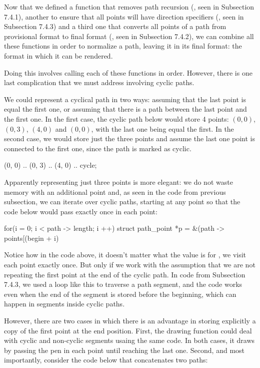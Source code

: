 Now that we defined a function that removes path recursion
(, seen in Subsection 7.4.1),
another to ensure that all points will have direction specifiers
(, seen in Subsection 7.4.3) and
a third one that converts all points of a path from provisional format
to final format (, seen in Subsection
7.4.2), we can combine all these functions in order to normalize a
path, leaving it in its final format: the format in which it can
be rendered.

Doing this involves calling each of these functions in order. However,
there is one last complication that we must address involving cyclic
paths.

We could represent a cyclical path in two ways: assuming that the last
point is equal the first one, or assuming that there is a path between
the last point and the first one. In the first case, the cyclic path
below would store 4 points: $(0, 0)$, $(0, 3)$, $(4, 0)$ and $(0, 0)$,
with the last one being equal the first. In the second case, we would
store just the three points and assume the last one point is connected
to the first one, since the path is marked as cyclic.

\alinhaverbatim
(0, 0) .. (0, 3) .. (4, 0) .. cycle;
\alinhanormal

Apparently representing just three points is more elegant: we do not
waste memory with an additional point and, as seen in the code from
previous subsection, we can iterate over cyclic paths, starting at any
point so that the code below would pass exactly once in each point:

\alinhaverbatim
for(i = 0; i < path -> length; i ++)
  struct path_point *p = &(path -> points[(begin + i) %
\alinhanormal

Notice how in the code above, it doesn't matter what the value is
for , we visit each point exactly once. But only if
we work with the assumption that we are not repeating the first point
at the end of the cyclic path. In code from Subsection 7.4.3, we used
a loop like this to traverse a path segment, and the code works even
when the end of the segment is stored before the beginning, which can
happen in segments inside cyclic paths.

However, there are two cases in which there is an advantage in storing
explicitly a copy of the first point at the end position. First, the
drawing function could deal with cyclic and non-cyclic segments usaing
the same code. In both cases, it draws by passing the pen in each
point until reaching the last one. Second, and most importantly,
consider the code below that concatenates two paths:

